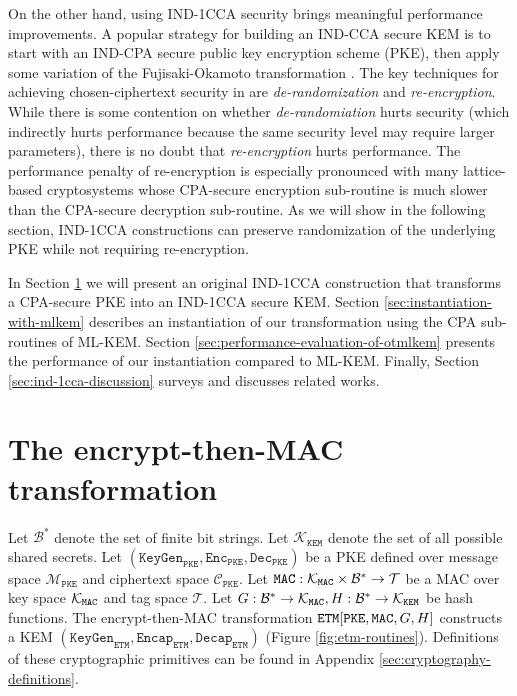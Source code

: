 \documentclass[letterpaper,12pt,titlepage,oneside,final]{book}
\newcommand{\pke}{\texttt{PKE}}
\newcommand{\keygen}{\texttt{KeyGen}}
\newcommand{\encrypt}{\texttt{Enc}}
\newcommand{\decrypt}{\texttt{Dec}}
\newcommand{\kem}{\texttt{KEM}}
\newcommand{\encap}{\texttt{Encap}}
\newcommand{\decap}{\texttt{Decap}}
\newcommand{\etm}{{\texttt{ETM}}}  %
\newcommand{\mac}{\texttt{\texttt{MAC}}}
\begin{document}
On the other hand, using IND-1CCA security brings meaningful performance improvements.
A popular strategy for building an IND-CCA secure KEM is to start with an IND-CPA secure public key encryption scheme (PKE), then apply some variation of the Fujisaki-Okamoto transformation \cite{DBLP:conf/crypto/FujisakiO99,DBLP:journals/joc/FujisakiO13,DBLP:conf/tcc/HofheinzHK17}.
The key techniques for achieving chosen-ciphertext security in are \textit{de-randomization} and \textit{re-encryption}.
While there is some contention on whether \textit{de-randomiation} hurts security \cite{cryptoeprint:2021/912} (which indirectly hurts performance because the same security level may require larger parameters), there is no doubt that \textit{re-encryption} hurts performance.
The performance penalty of re-encryption is especially pronounced with many lattice-based cryptosystems whose CPA-secure encryption sub-routine is much slower than the CPA-secure decryption sub-routine.
As we will show in the following section, IND-1CCA constructions can preserve randomization of the underlying PKE while not requiring re-encryption.

In Section \ref{sec:encrypt-then-mac-transformation} we will present an original IND-1CCA construction that transforms a CPA-secure PKE into an IND-1CCA secure KEM. 
Section \ref{sec:instantiation-with-mlkem} describes an instantiation of our transformation using the CPA sub-routines of ML-KEM. 
Section \ref{sec:performance-evaluation-of-otmlkem} presents the performance of our instantiation compared to ML-KEM. 
Finally, Section \ref{sec:ind-1cca-discussion} surveys and discusses related works.

\section{The encrypt-then-MAC transformation}\label{sec:encrypt-then-mac-transformation}
Let $\mathcal{B}^\ast$ denote the set of finite bit strings. Let $\mathcal{K}_\kem$ denote the set of all possible shared secrets. Let $(\keygen_\pke, \encrypt_\pke, \decrypt_\pke)$ be a PKE defined over message space $\mathcal{M}_\pke$ and ciphertext space $\mathcal{C}_\pke$. Let $\mac: \mathcal{K}_\mac \times \mathcal{B}^\ast \rightarrow \mathcal{T}$ be a MAC over key space $\mathcal{K}_\mac$ and tag space $\mathcal{T}$. Let $G: \mathcal{B}^\ast \rightarrow \mathcal{K}_\mac, H: \mathcal{B}^\ast \rightarrow \mathcal{K}_\kem$ be hash functions. The encrypt-then-MAC transformation $\etm[\pke,\mac,G,H]$ constructs a KEM $(\keygen_\etm, \encap_\etm, \decap_\etm)$ (Figure \ref{fig:etm-routines}).
Definitions of these cryptographic primitives can be found in Appendix \ref{sec:cryptography-definitions}.
\end{document}
